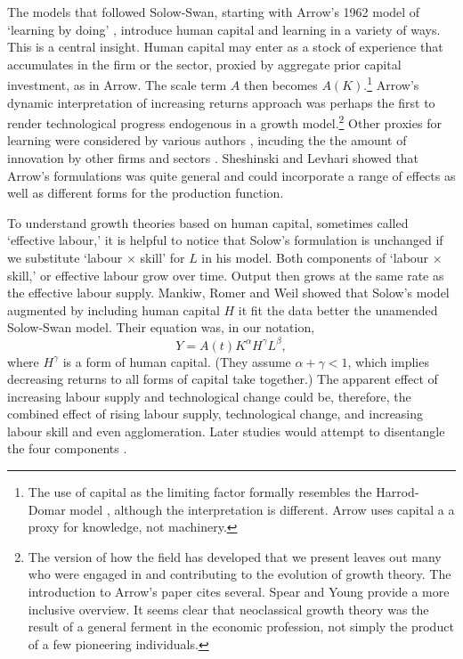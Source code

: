 The models that followed Solow-Swan, starting with Arrow's 1962 model of `learning by doing' \cite{arrowEconomicImplicationsLearning1962a}, introduce \gls{human capital} and learning in a variety of ways. This is a central insight. Human capital may enter  as a stock of experience that accumulates in the firm or the sector, proxied by aggregate prior capital investment, as  in Arrow. The scale term $A$ then becomes $A(K)$.\footnote{The use of capital as the limiting factor formally resembles the Harrod-Domar model \cite{harrodEssayDynamicTheory1939, domarCapitalExpansionRate1946}, although the interpretation is different. Arrow uses capital a a proxy for knowledge, not machinery.} Arrow's  dynamic interpretation of increasing returns  approach was perhaps the first to  render technological progress endogenous in a growth model.\footnote{The version of how the field has developed that we present leaves out many who were engaged in and contributing to the evolution of growth theory. The introduction to  Arrow's paper cites several. Spear and Young\cite{spearMACROECONOMICDYNAMICSSURVEY2018} provide a more inclusive overview. It seems clear that neoclassical growth theory was the result of a general ferment in the economic profession, not simply the product of a few pioneering individuals.} 
Other proxies for learning were considered by various authors \cite{levhariExtensionsArrowLearning1966, sheshinskiOptimalAccumulationLearning1967}, incuding the the amount of innovation by other firms and sectors  \cite{kingEndogenousGrowthRole1989}. Sheshinski and Levhari showed that Arrow's formulations was quite general and could incorporate a range of effects as well as different forms for the production function.


To understand  growth theories based on \gls{human capital},  sometimes called `\gls{effective labour},' it is helpful to notice that Solow's formulation is unchanged if we substitute `labour $\times$ skill' for $L$ in his model. Both components of `labour $\times$  skill,' or effective labour grow over time. Output then grows at the same rate as the effective labour supply. Mankiw, Romer and Weil \cite{mankiwContributionEmpiricsEconomic1992} showed that  
Solow's model  augmented by including human capital $H$ it fit the data better the unamended Solow-Swan model. Their equation was, in our notation,   
\begin{equation*}
Y=A(t)K^\alpha H^\gamma L^\beta, 
\end{equation*}
where $H^\gamma$ is a form of human capital. (They assume $\alpha+\gamma<1$, which implies decreasing returns to all forms of capital take together.) The apparent effect of increasing labour supply and technological change could be, therefore, the combined effect of rising labour supply, technological change, and increasing labour skill and even agglomeration. Later studies would attempt to disentangle the four components .


